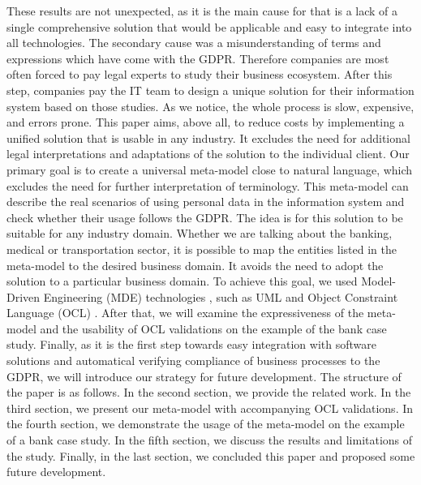 \documentclass[11pt,english]{article}
\begin{document}
\newline These results are not unexpected, as it is the main cause for that is a lack of a single comprehensive solution that would be applicable and easy to integrate into all technologies. The secondary cause was a misunderstanding of terms and expressions which have come with the GDPR. Therefore companies are most often forced to pay legal experts to study their business ecosystem. After this step, companies pay the IT team to design a unique solution for their information system based on those studies. As we notice, the whole process is slow, expensive, and errors prone. \newline This paper aims, above all, to reduce costs by implementing a unified solution that is usable in any industry. It excludes the need for additional legal interpretations and adaptations of the solution to the individual client. Our primary goal is to create a universal meta-model close to natural language, which excludes the need for further interpretation of terminology. This meta-model can describe the real scenarios of using personal data in the information system and check whether their usage follows the GDPR. The idea is for this solution to be suitable for any industry domain. Whether we are talking about the banking, medical or transportation sector, it is possible to map the entities listed in the meta-model to the desired business domain. It avoids the need to adopt the solution to a particular business domain. To achieve this goal, we used Model-Driven Engineering (MDE) technologies \cite{mde}, such as UML \cite{uml} and Object Constraint Language (OCL) \cite{ocl}. After that, we will examine the expressiveness of the meta-model and the usability of OCL validations on the example of the bank case study. Finally, as it is the first step towards easy integration with software solutions and automatical verifying compliance of business processes to the GDPR, we will introduce our strategy for future development. \newline The structure of the paper is as follows. In the second section, we provide the related work. In the third section, we present our meta-model with accompanying OCL validations. In the fourth section, we demonstrate the usage of the meta-model on the example of a bank case study. In the fifth section, we discuss the results and limitations of the study. Finally, in the last section, we concluded this paper and proposed some future development.
\end{document}

